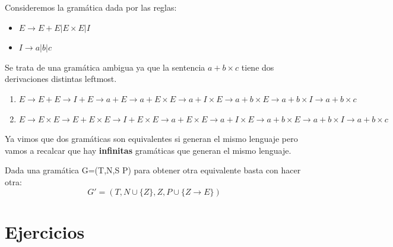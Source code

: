 \documentclass{apuntes}
\begin{document}
\begin{example}
Consideremos la gramática dada por las reglas:
\begin{itemize}
\item $E \rightarrow E + E | E \times E | I$
\item $I \rightarrow a | b | c$
\end{itemize}

Se trata de una gramática ambigua ya que la sentencia $a+b\times c$ tiene dos derivaciones distintas leftmost.
\begin{enumerate}
\item $E \rightarrow E + E \rightarrow I + E \rightarrow a + E \rightarrow a + E \times E \rightarrow a + I \times E \rightarrow a + b \times E \rightarrow a + b \times I \rightarrow a + b \times c$
\item $E \rightarrow E \times E \rightarrow E + E \times E \rightarrow I + E \times E \rightarrow a + E \times E \rightarrow a + I \times E \rightarrow a+b \times E \rightarrow a + b \times I \rightarrow a + b \times c$
\end{enumerate}
\end{example}

Ya vimos que dos gramáticas son equivalentes si generan el mismo lenguaje pero vamos a recalcar que hay \textbf{infinitas} gramáticas que generan el mismo lenguaje. 

Dada una gramática G=(T,N,S P) para obtener otra equivalente basta con hacer otra:
\[G' =(T, N \cup \lbrace Z \rbrace, Z, P \cup \lbrace Z \rightarrow E \rbrace)\]

\appendix
\chapter{Ejercicios}




\printindex
\end{document}
